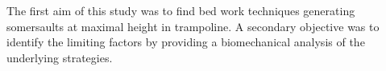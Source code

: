 The first aim of this study was to find bed work techniques generating somersaults at maximal height in trampoline. 
A secondary objective was to identify the limiting factors by providing a biomechanical analysis of the underlying strategies.



